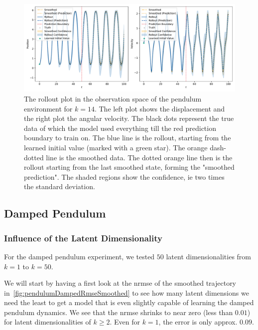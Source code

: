 			\begin{figure}
				\centering
				\includegraphics[width=\linewidth]{figures/results/pendulum/run-latent-dim-14/rollout-observations-N0.pdf}
				\caption{The rollout plot in the observation space of the pendulum environment for \(k = 14\). The left plot shows the displacement and the right plot the angular velocity. The black dots represent the true data of which the model used everything till the red prediction boundary to train on. The blue line is the rollout, starting from the learned initial value (marked with a green star). The orange dash-dotted line is the smoothed data. The dotted orange line then is the rollout starting from the last smoothed state, forming the "smoothed prediction". The shaded regions show the confidence, \ac{ie} two times the standard deviation.}
				\label{fig:pendulumRolloutL14}
			\end{figure}

	\subsection{Damped Pendulum}

		\subsubsection{Influence of the Latent Dimensionality}
			For the damped pendulum experiment, we tested \(50\) latent dimensionalities from \( k = 1 \) to \( k = 50 \).

			We will start by having a first look at the \ac{nrmse} of the smoothed trajectory in~\autoref{fig:pendulumDampedRmseSmoothed} to see how many latent dimensions we need the least to get a model that is even slightly capable of learning the damped pendulum dynamics. We see that the \ac{nrmse} shrinks to near zero (less than \( 0.01 \)) for latent dimensionalities of \( k \geq 2 \). Even for \( k = 1 \), the error is only approx. \( 0.09 \).


